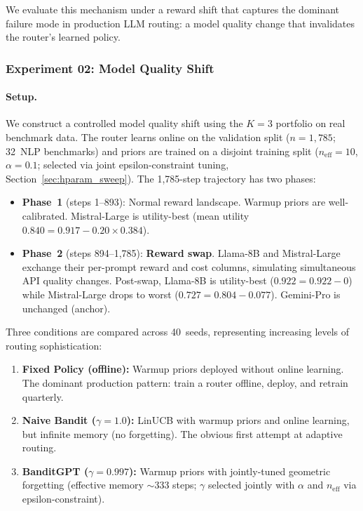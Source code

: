 We evaluate this mechanism under a reward shift that captures
the dominant failure mode in production LLM routing: a model
quality change that invalidates the router's learned policy.


\subsubsection{Experiment 02: Model Quality Shift}
\label{sec:reward_shift}

\paragraph{Setup.}
We construct a controlled model quality shift using the $K{=}3$
portfolio on real benchmark data.
The router learns online on the validation split
($n{=}1{,}785$; 32~NLP benchmarks) and priors are trained on a
disjoint training split ($n_{\mathrm{eff}}{=}10$, $\alpha{=}0.1$;
selected via joint epsilon-constraint tuning,
Section~\ref{sec:hparam_sweep}).
The 1{,}785-step trajectory has two phases:

\begin{itemize}[nosep,leftmargin=*]
  \item \textbf{Phase~1} (steps 1--893): Normal reward landscape.
    Warmup priors are well-calibrated.
    Mistral-Large is utility-best
    (mean utility $0.840 = 0.917 - 0.20 \times 0.384$).

  \item \textbf{Phase~2} (steps 894--1{,}785): \textbf{Reward swap}.
    Llama-8B and Mistral-Large exchange their per-prompt reward
    and cost columns, simulating simultaneous API quality changes.
    Post-swap, Llama-8B is utility-best
    ($0.922 = 0.922 - 0$) while Mistral-Large drops to worst
    ($0.727 = 0.804 - 0.077$).  Gemini-Pro is unchanged (anchor).
\end{itemize}

\noindent
Three conditions are compared across 40~seeds, representing
increasing levels of routing sophistication:
\begin{enumerate}[nosep,leftmargin=*]
  \item \textbf{Fixed Policy (offline):}
    Warmup priors deployed without online learning.
    The dominant production pattern: train a router offline,
    deploy, and retrain quarterly.
  \item \textbf{Naive Bandit ($\gamma{=}1.0$):}
    LinUCB with warmup priors and online learning, but
    infinite memory (no forgetting).
    The obvious first attempt at adaptive routing.
  \item \textbf{BanditGPT ($\gamma{=}0.997$):}
    Warmup priors with jointly-tuned geometric forgetting
    (effective memory ${\sim}333$ steps; $\gamma$ selected
    jointly with $\alpha$ and $n_{\mathrm{eff}}$ via
    epsilon-constraint).
\end{enumerate}

